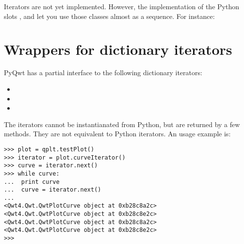 \documentclass{manual}
\begin{document}
Iterators are not yet implemented. However, the implementation of the
Python slots ,  and
 let you use those classes almost as a sequence.
For instance:



\section{Wrappers for dictionary iterators \label{dictit}}

PyQwt has a partial interface to the following dictionary iterators:
\begin{itemize}
\item
\item
\item
\end{itemize}

The iterators cannot be instantianated from Python, but are returned by a few
methods.  They are not equivalent to Python iterators.  An usage example is:
\begin{verbatim}
>>> plot = qplt.testPlot()
>>> iterator = plot.curveIterator()
>>> curve = iterator.next()
>>> while curve:
...  print curve
...  curve = iterator.next()
...
<Qwt4.Qwt.QwtPlotCurve object at 0xb28c8a2c>
<Qwt4.Qwt.QwtPlotCurve object at 0xb28c8e2c>
<Qwt4.Qwt.QwtPlotCurve object at 0xb28c8a2c>
<Qwt4.Qwt.QwtPlotCurve object at 0xb28c8e2c>
>>>
\end{verbatim}
\end{document}

